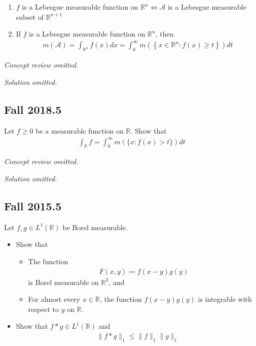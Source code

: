 \begin{enumerate}
\def\labelenumi{\alph{enumi}.}
\item
  \(f\) is a Lebesgue measurable function on
  \({\mathbb{R}}^n \iff \mathcal A\) is a Lebesgue measurable subset of
  \({\mathbb{R}}^{n+1}\)
\item
  If \(f\) is a Lebesgue measurable function on \({\mathbb{R}}^n\), then
  \begin{align*}
  m(\mathcal{A})=\int _{{\mathbb{R}}^{n}} f(x) d x=\int_{0}^{\infty} m\left(\left\{x \in {\mathbb{R}}^{n}: f(x) \geq t\right\}\right) dt
  \end{align*}
\end{enumerate}

\emph{Concept review omitted.}

\emph{Solution omitted.}

\hypertarget{fall-2018.5}{%
\subsection{Fall 2018.5}\label{fall-2018.5}}

Let \(f \geq 0\) be a measurable function on \({\mathbb{R}}\). Show that
\begin{align*}
\int _{{\mathbb{R}}} f = \int _{0}^{\infty} m(\{x: f(x)>t\}) dt
\end{align*}

\emph{Concept review omitted.}

\emph{Solution omitted.}

\hypertarget{fall-2015.5}{%
\subsection{Fall 2015.5}\label{fall-2015.5}}

\begin{problem}[?]

Let \(f, g \in L^1({\mathbb{R}})\) be Borel measurable.

\begin{itemize}
\tightlist
\item
  Show that

  \begin{itemize}
  \tightlist
  \item
    The function
    \begin{align*}F(x, y) \coloneqq f(x-y) g(y)\end{align*}
    is Borel measurable on \({\mathbb{R}}^2\), and
  \item
    For almost every \(x\in {\mathbb{R}}\), the function \(f(x-y)g(y)\)
    is integrable with respect to \(y\) on \({\mathbb{R}}\).
  \end{itemize}
\item
  Show that \(f\ast g \in L^1({\mathbb{R}})\) and
  \begin{align*}
  \|f * g\|_{1} \leq \|f\|_{1} \|g\|_{1}
  \end{align*}
\end{itemize}

\end{problem}

